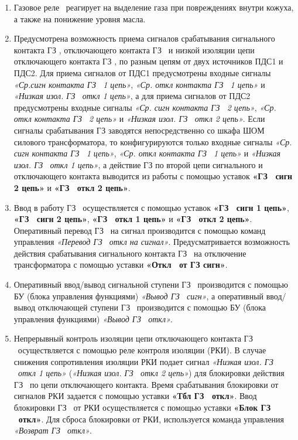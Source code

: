 \begin{enumerate}

\item
Газовое реле \Type~реагирует на выделение газа при повреждениях внутри кожуха, а также на понижение уровня масла.

\item
Предусмотрена возможность приема сигналов срабатывания сигнального контакта ГЗ \Type, отключающего контакта ГЗ \Type~и низкой изоляции цепи отключающего контакта ГЗ \Type, по разным цепям от двух источников ПДС1 и ПДС2. Для приема сигналов от ПДС1 предусмотрены входные сигналы \textit{«Ср.сигн контакта ГЗ \Type~1 цепь»}, \textit{«Ср. откл контакта ГЗ \Type~1 цепь»} и \textit{«Низкая изол. ГЗ \Type~откл 1 цепь»}, а для приема сигналов от ПДС2 предусмотрены входные сигналы \textit{«Ср. сигн контакта ГЗ \Type~2 цепь»}, \textit{«Ср. откл контакта ГЗ \Type~2 цепь»} и \textit{«Низкая изол. ГЗ \Type~откл 2 цепь»}. Если сигналы срабатывания ГЗ заводятся непосредственно со шкафа ШОМ силового трансформатора, то конфигурируются только входные сигналы \textit{«Ср. сигн контакта ГЗ \Type~1 цепь»}, \textit{«Ср. откл контакта ГЗ \Type~1 цепь»} и \textit{«Низкая изол. ГЗ \Type~откл 1 цепь»}, а действие ГЗ по второй цепи сигнального и отключающего контакта выводится из работы с помощью уставок \textbf{«ГЗ \Type~сигн 2 цепь»} и \textbf{«ГЗ \Type~откл 2 цепь»}.

\item
Ввод в работу ГЗ \Type~осуществляется с помощью уставок \textbf{«ГЗ \Type~сигн 1 цепь»}, \textbf{«ГЗ \Type~сигн 2 цепь»}, \textbf{«ГЗ \Type~откл 1 цепь»} и \textbf{«ГЗ \Type~откл 2 цепь»}. Оперативный перевод ГЗ \Type~на сигнал производится с помощью команд управления \textit{«Перевод ГЗ \Type~откл на сигнал»}. Предусматривается возможность действия срабатывания сигнального контакта ГЗ \Type~на отключение трансформатора с помощью уставки \textbf{«Откл \Type~от ГЗ сигн»}.

\item
Оперативный ввод/вывод сигнальной ступени ГЗ \Type~производится с помощью БУ (блока управления функциями) \textit{«Вывод ГЗ \Type~сигн»}, а оперативный ввод/вывод отключающей ступени ГЗ \Type~производится с помощью БУ (блока управления функциями) \textit{«Вывод ГЗ \Type~откл»}.

\item
Непрерывный контроль изоляции цепи отключающего контакта ГЗ \Type~осуществляется с помощью реле контроля изоляции (РКИ). В случае снижения сопротивления изоляции РКИ подает сигнал \textit{«Низкая изол. ГЗ \Type~откл 1 цепь»} (\textit{«Низкая изол. ГЗ \Type~откл 2 цепь»}) для блокировки действия ГЗ \Type~по цепи отключающего контакта. Время срабатывания блокировки от сигналов РКИ задается с помощью уставки \textbf{«Тбл ГЗ \Type~откл»}. Ввод блокировки ГЗ \Type~от РКИ осуществляется с помощью уставки \textbf{«Блок ГЗ \Type~откл»}. Для сброса блокировки от РКИ, используется команда управления \textit{«Возврат ГЗ \Type~откл»}.


\end{enumerate}
